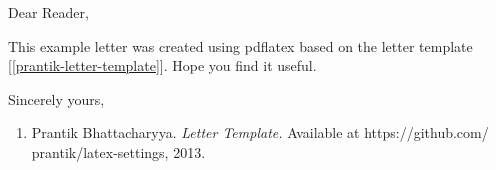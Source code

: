 \documentclass{letter}
\newcommand{\si}{\begin{enumerate}}
\newcommand{\ii}{\item}
\newcommand{\ei}{\end{enumerate}}
\begin{document}
\begin{letter}{} 

\begin{center}{} 
\end{center} \vfill 

\opening{Dear Reader,}
 
This example letter was created using pdflatex based on the letter template [\ref{prantik-letter-template}]. Hope you find it useful.
 
\closing{Sincerely yours,}
  
\encl{}                 

\si
\ii{\label{prantik-letter-template}  {Prantik Bhattacharyya}. \textit{Letter Template.} Available at https://github.com/ prantik/latex-settings, 2013.}
\ei

\end{letter}

\end{document}
